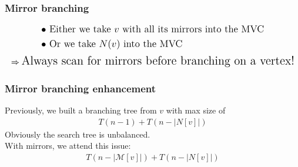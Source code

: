 \documentclass{beamer}[12pt]
\begin{document}
	\begin{frame}
	\frametitle{Mirror branching}
	
	\hspace*{0.8cm}
	
	
	
	\vspace*{5mm}
	\hspace*{2.2cm}{\Large Refined branching rule:}
	\begin{align*}
	&\text{\large	$\bullet$  Either we take $ v $ with all its mirrors into the MVC}\\
	&\text{\large   $\bullet$  Or we take $ N(v)$ into the MVC}
	\end{align*}
	\pause
	\vspace*{-5mm}
	\begin{align*}
		{\Large \Rightarrow \text{Always scan for mirrors before branching on a vertex!}}
	\end{align*}
	
	\end{frame}
	
	\begin{frame}
			\frametitle{Mirror branching enhancement}
			
			Previously, we built a branching tree from $ v $ with max size of
			\begin{align*}
				T(n-1) + T(n - |N[v]|)
			\end{align*}
			\pause
			Obviously the search tree is unbalanced.\\
			With mirrors, we attend this issue:\\
			\begin{align*}
				T(n- |\mathcal{M}[v]|) + T(n - |N[v]|)
			\end{align*}
	\end{frame}
\end{document}
